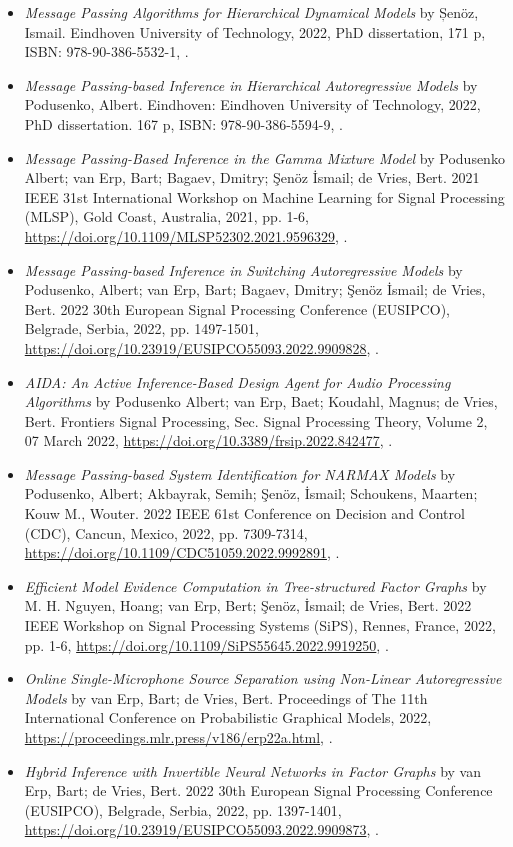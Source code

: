\begin{itemize}
    \item \textit{Message Passing Algorithms for Hierarchical Dynamical Models} by Șenöz, Ismail.
    Eindhoven University of Technology, 2022, PhD dissertation, 171 p, ISBN: 978-90-386-5532-1, \citep{senoz_thesis}.
    \item \textit{Message Passing-based Inference in Hierarchical Autoregressive Models} by Podusenko, Albert.
    Eindhoven: Eindhoven University of Technology, 2022, PhD dissertation. 167 p, ISBN: 978-90-386-5594-9, \citep{podusenko_thesis}.
    \item \textit{Message Passing-Based Inference in the Gamma Mixture Model} by Podusenko Albert; van Erp, Bart; Bagaev, Dmitry; Şenöz İsmail; de Vries, Bert. 2021 IEEE 31st International Workshop on Machine Learning for Signal Processing (MLSP), Gold Coast, Australia, 2021, pp. 1-6, \url{https://doi.org/10.1109/MLSP52302.2021.9596329}, \citep{podusenko_message_2021}.
    \item \textit{Message Passing-based Inference in Switching Autoregressive Models} by Podusenko, Albert; van Erp, Bart; Bagaev, Dmitry; Şenöz İsmail; de Vries, Bert. 2022 30th European Signal Processing Conference (EUSIPCO), Belgrade, Serbia, 2022, pp. 1497-1501, \url{https://doi.org/10.23919/EUSIPCO55093.2022.9909828}, \citep{podusenko_message_2021-1}.
    \item \textit{AIDA: An Active Inference-Based Design Agent for Audio Processing Algorithms} by Podusenko Albert; van Erp, Baet; Koudahl, Magnus; de Vries, Bert. Frontiers Signal Processing, Sec. Signal Processing Theory, Volume 2, 07 March 2022, \url{https://doi.org/10.3389/frsip.2022.842477}, \citep{podusenko_aida_2022}.
    \item \textit{Message Passing-based System Identification for NARMAX Models} by Podusenko, Albert; Akbayrak, Semih; Şenöz, İsmail; Schoukens, Maarten; Kouw M., Wouter. 2022 IEEE 61st Conference on Decision and Control (CDC), Cancun, Mexico, 2022, pp. 7309-7314, \url{https://doi.org/10.1109/CDC51059.2022.9992891}, \citep{semih_akbayrak_podusenkoakbayrak-2022-cdc_nodate}.
    \item \textit{Efficient Model Evidence Computation in Tree-structured Factor Graphs} by M. H. Nguyen, Hoang; van Erp, Bert; Şenöz, İsmail; de Vries, Bert. 2022 IEEE Workshop on Signal Processing Systems (SiPS), Rennes, France, 2022, pp. 1-6, \url{https://doi.org/10.1109/SiPS55645.2022.9919250}, \citep{nguyen_efficient_2022}.
    \item \textit{Online Single-Microphone Source Separation using Non-Linear Autoregressive Models} by van Erp, Bart; de Vries, Bert. Proceedings of The 11th International Conference on Probabilistic Graphical Models, 2022, \url{https://proceedings.mlr.press/v186/erp22a.html}, \citep{van_erp_online_2022}.
    \item \textit{Hybrid Inference with Invertible Neural Networks in Factor Graphs} by van Erp, Bart; de Vries, Bert. 2022 30th European Signal Processing Conference (EUSIPCO), Belgrade, Serbia, 2022, pp. 1397-1401, \url{https://doi.org/10.23919/EUSIPCO55093.2022.9909873}, \citep{van_erp_hybrid_2022}.
\end{itemize}
